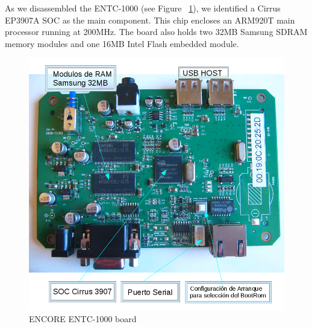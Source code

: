 \documentclass[conference]{IEEEtran}
\newcommand{\nota}[1]{}
\begin{document}
\nota { 
En nuestro caso de estudio, al desmontar el ENTC-1000 (ver la Figura ~\ref{fig:placa-encore} )
, identificamos
un SOC Cirrus EP3907A como el componente principal,
que contiene un procesador central de arquitectura ARM, modelo ARM920T
a una velocidad de 200Mhz.
Además, la placa presenta dos módulos de memoria SDRAM Samsung de 32MB cada uno, y un modulo
de memoria FLASH embebida INTEL de 16MB.
}

As we disassembled the ENTC-1000 (see Figure ~\ref{fig:placa-encore}), we identified a Cirrus EP3907A SOC as the main component. This chip encloses an ARM920T main processor running at 200MHz. The board also holds two 32MB Samsung SDRAM memory modules and one 16MB Intel Flash embedded module.


\begin{figure}
\begin{center}
\includegraphics[scale=0.40]{placa-encore.png}
\caption{ENCORE ENTC-1000 board}
\label{fig:placa-encore}
\end{center}
\end{figure}
\nota{
Afortunadamente para nuestra investigación,
la empresa Cirrus publica documentación detallada del SOC Cirrus 3907A \cite{cirrus}.
Junto con esta documentación Cirrus también publica software
para su programación, y código fuente de
Linux para experimentación. Completando la búsqueda, hemos encontrado
documentación de placas de laboratorios experimentales, que la fabrica Cirrus publica.
Estos diseños son muy útiles a las empresas que utilizan el SOC de Cirrus,
ya que lo pueden tomar como diseño de referencia para sus circuitos particulares.
}
\end{document}
